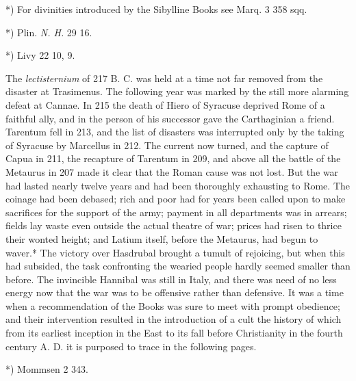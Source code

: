 \documentclass[a4paper, 11pt, oneside, polutonikogreek, english]{article}
\begin{document}
*) For divinities introduced by the Sibylline Books see Marq. 3 358 sqq.

*) Plin. \emph{N. H.} 29 16.

*) Livy 22 10, 9.

The \emph{lectisternium} of 217 B. C. was held at a time not far removed from the disaster at Trasimenus. The following year was marked by the still more alarming defeat at Cannae. In 215 the death of Hiero of Syracuse deprived Rome of a faithful ally, and in the person of his successor gave the Carthaginian a friend. Tarentum fell in 213, and the list of disasters was interrupted only by the taking of Syracuse by Marcellus in 212. The current now turned, and the capture of Capua in 211, the recapture of Tarentum in 209, and above all the battle of the Metaurus in 207 made it clear that the Roman cause was not lost. But the war had lasted nearly twelve years and had been thoroughly exhausting to Rome. The coinage had been debased; rich and poor had for years been called upon to make sacrifices for the support of the army; payment in all departments was in arrears; fields lay waste even outside the actual theatre of war; prices had risen to thrice their wonted height; and Latium itself, before the Metaurus, had begun to waver.* The victory over Hasdrubal brought a tumult of rejoicing, but when this had subsided, the task confronting the wearied people hardly seemed smaller than before. The invincible Hannibal was still in Italy, and there was need of no less energy now that the war was to be offensive rather than defensive. It was a time when a recommendation of the Books was sure to meet with prompt obedience; and their intervention resulted in the introduction of a cult the history of which from its earliest inception in the East to its fall before Christianity in the fourth century A. D. it is purposed to trace in the following pages.

*) Mommsen 2 343.
\end{document}
